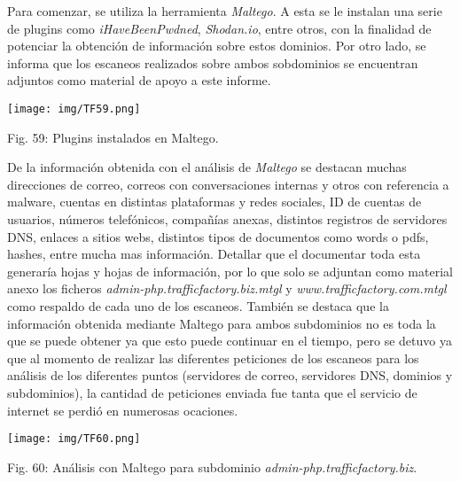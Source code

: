 \documentclass[12pt,oneside,a4paper]{book}
\begin{document}
\vspace{1em}

\hspace{20pt}
Para comenzar, se utiliza la herramienta \textit{Maltego}. A esta se le instalan una serie de plugins como \textit{iHaveBeenPwdned}, \textit{Shodan.io}, entre otros, con la finalidad de potenciar la obtención de información sobre estos dominios. Por otro lado, se informa que los escaneos realizados sobre ambos sobdominios se encuentran adjuntos como material de apoyo a este informe.

\vspace{2em}

\begin{center}
	\texttt{[image: img/TF59.png]}
    
\vspace{0.1em}
    
    Fig. 59: Plugins instalados en Maltego.
\end{center}

\vspace{2em}

\hspace{20pt}
De la información obtenida con el análisis de \textit{Maltego} se destacan muchas direcciones de correo,  correos con conversaciones internas y otros con referencia a malware, cuentas en distintas plataformas y redes sociales, ID de cuentas de usuarios, números telefónicos, compañías anexas, distintos registros de servidores DNS, enlaces a sitios webs, distintos tipos de documentos como words o pdfs, hashes, entre mucha mas información. Detallar que el documentar toda esta generaría hojas y hojas de información, por lo que solo se adjuntan como material anexo los ficheros \textit{admin-php.trafficfactory.biz.mtgl} y \textit{www.trafficfactory.com.mtgl} como respaldo de cada uno de los escaneos. También se destaca que la información obtenida mediante Maltego para ambos subdominios no es toda la que se puede obtener ya que esto puede continuar en el tiempo, pero se detuvo ya que al momento de realizar las diferentes peticiones de los escaneos para los análisis de los diferentes puntos (servidores de correo, servidores DNS, dominios y subdominios), la cantidad de peticiones enviada fue tanta que el servicio de internet se perdió en numerosas ocaciones.

\vspace{2em}

\begin{center}
	\texttt{[image: img/TF60.png]}
    
\vspace{0.1em}
    
    Fig. 60: Análisis con Maltego para subdominio \textit{admin-php.trafficfactory.biz}.
\end{center}
\end{document}
